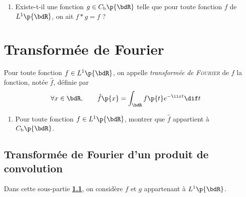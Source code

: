 \documentclass[a4paper,french,bookmarks]{article}
\begin{document}
\begin{enumerate}
        \item Existe-t-il une fonction $g \in C_\text b\p{\bdR}$ telle que pour toute fonction $f$ de $L^1\p{\bdR}$, on ait $f \ast g = f$ ?
        
        \noafter
        \yesafter\nobefore
    \end{enumerate}
    
    \section{Transformée de Fourier}
    
    \setcounter{subsection}{1}
    Pour toute fonction $f \in L^1\p{\bdR}$, on appelle \emph{transformée de \textsc{Fourier}} de $f$ la fonction, notée $\hat f$, définie par
    \[ \forall x \in \bdR,\qquad \hat f\p{x} = \int_\bdR f\p{t}e^{-\ii x t}\dif t\]
    
    \begin{enumerate}
        \item Pour toute fonction $f \in L^1\p{\bdR}$, montrer que $\hat f$ appartient à $C_\text b\p{\bdR}$.
        
    \end{enumerate}
    
    \subsection{Transformée de Fourier d’un produit de convolution}\label{subsec:II.B}
    
    Dans cette sous-partie \textbf{\sffamily\ref{subsec:II.B}}, on considère $f$ et $g$ appartenant à $L^1\p{\bdR}$. 
    
\end{document}
